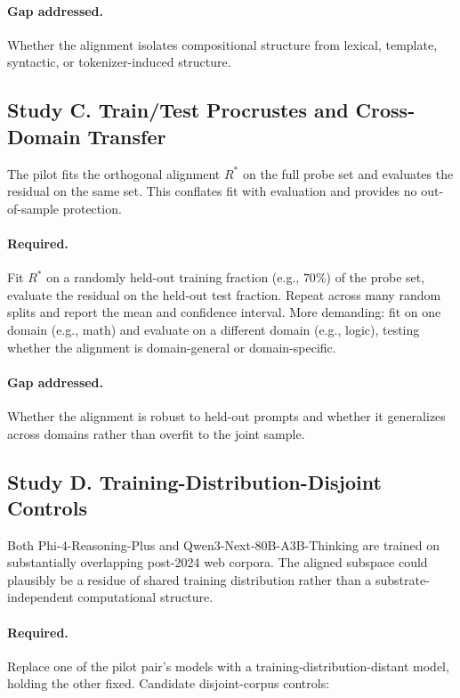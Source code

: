 \paragraph{Gap addressed.} Whether the alignment isolates compositional
structure from lexical, template, syntactic, or tokenizer-induced
structure.

\subsection{Study C. Train/Test Procrustes and Cross-Domain Transfer}

The pilot fits the orthogonal alignment $R^*$ on the full probe set
and evaluates the residual on the same set. This conflates fit with
evaluation and provides no out-of-sample protection.

\paragraph{Required.} Fit $R^*$ on a randomly held-out training
fraction (e.g., $70\%$) of the probe set, evaluate the residual on
the held-out test fraction. Repeat across many random splits and
report the mean and confidence interval. More demanding: fit on one
domain (e.g., math) and evaluate on a different domain (e.g., logic),
testing whether the alignment is domain-general or domain-specific.

\paragraph{Gap addressed.} Whether the alignment is robust to held-out
prompts and whether it generalizes across domains rather than overfit
to the joint sample.

\subsection{Study D. Training-Distribution-Disjoint Controls}

Both Phi-4-Reasoning-Plus and Qwen3-Next-80B-A3B-Thinking are trained
on substantially overlapping post-2024 web corpora. The aligned
subspace could plausibly be a residue of shared training distribution
rather than a substrate-independent computational structure.

\paragraph{Required.} Replace one of the pilot pair's models with a
training-distribution-distant model, holding the other fixed.
Candidate disjoint-corpus controls:

